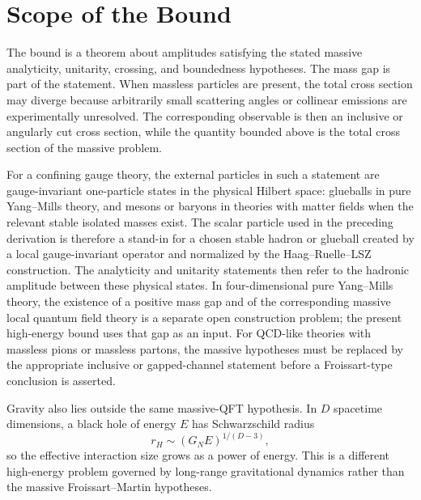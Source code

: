 \begin{center}
\end{center}

\section{Scope of the Bound}

The bound is a theorem about amplitudes satisfying the stated massive
analyticity, unitarity, crossing, and boundedness hypotheses.  The mass gap
is part of the statement.  When massless particles are present, the total
cross section may diverge because arbitrarily small scattering angles or
collinear emissions are experimentally unresolved.  The corresponding
observable is then an inclusive or angularly cut cross section, while the
quantity bounded above is the total cross section of the massive problem.

For a confining gauge theory, the external particles in such a statement are
gauge-invariant one-particle states in the physical Hilbert space: glueballs in
pure Yang--Mills theory, and mesons or baryons in theories with matter fields
when the relevant stable isolated masses exist.  The scalar particle used in
the preceding derivation is therefore a stand-in for a chosen stable hadron or
glueball created by a local gauge-invariant operator and normalized by the
Haag--Ruelle--LSZ construction.  The analyticity and unitarity statements then
refer to the hadronic amplitude between these physical states.  In
four-dimensional pure Yang--Mills theory, the existence of a positive mass gap
and of the corresponding massive local quantum field theory is a separate open
construction problem; the present high-energy bound uses that gap as an input.
For QCD-like theories with massless pions or massless partons, the massive
hypotheses must be replaced by the appropriate inclusive or gapped-channel
statement before a Froissart-type conclusion is asserted.

Gravity also lies outside the same massive-QFT hypothesis.  In \(D\) spacetime
dimensions, a black hole of energy \(E\) has Schwarzschild radius
\[
  r_H\sim (G_NE)^{1/(D-3)},
\]
so the effective interaction size grows as a power of energy.  This is a
different high-energy problem governed by long-range gravitational dynamics
rather than the massive Froissart--Martin hypotheses.
